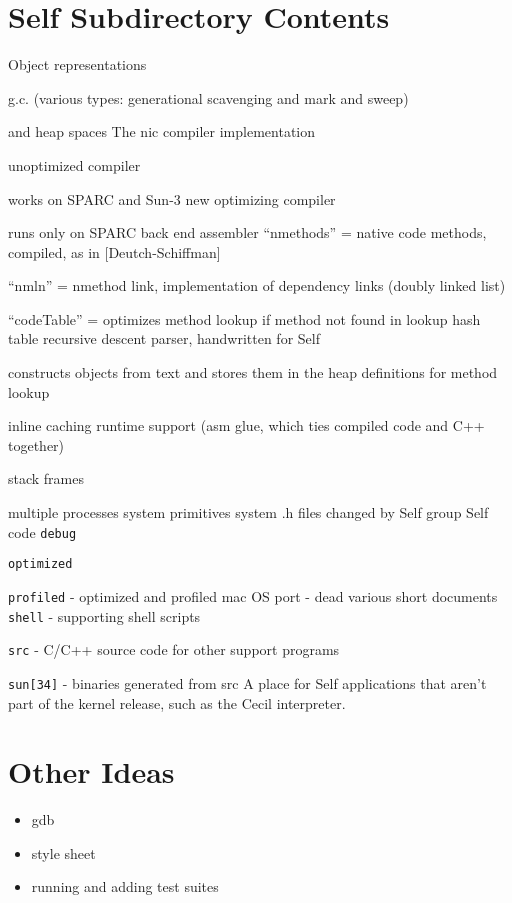 \section{Self Subdirectory Contents}
\begin{description}
\bq
	Object representations

	g.c. (various types:  generational scavenging and mark and sweep)

		and heap spaces
\eq
{}
\bq
    	The nic compiler implementation

	unoptimized compiler

	works on SPARC and Sun-3
\eq
{}
\bq
	new optimizing compiler

	runs only on SPARC
\eq
{}
\bq
	back end assembler
\eq
{}
\bq
	``nmethods'' = native code methods, compiled, as in [Deutch-Schiffman]

	``nmln'' = nmethod link, implementation of dependency links
		(doubly linked list)

	``codeTable'' = optimizes method lookup if method not found in lookup
		hash table
\eq
{}
\bq
	recursive descent parser, handwritten for Self

	constructs objects from text and stores them in the heap
\eq
{}
\bq
	definitions for method lookup

	inline caching
\eq
{}
\bq
	runtime support (asm glue, which ties compiled code and C++ together)

	stack frames

	multiple processes
\eq
{}
\bq
	system primitives
\eq
{}
\bq
	system .h files changed by Self group
\eq
{}
\bq
	Self code
\eq
{}
\bq
	{\tt debug}

	{\tt optimized}

	{\tt profiled} - optimized and profiled
\eq
{}
\bq
	mac OS port - dead
\eq
{}
\bq
	various short documents
\eq
{}
\bq
        {\tt shell} - supporting shell scripts

	{\tt src} - C/C++ source code for other support programs

	{\tt sun[34]} - binaries generated from src
\eq
{}
\bq
	A place for Self applications that aren't part of the kernel
release, such as the Cecil interpreter.
\eq
\end{description}

\section{Other Ideas}
\begin{itemize}
\item gdb
\item style sheet
\item running and adding test suites
\end{itemize}


